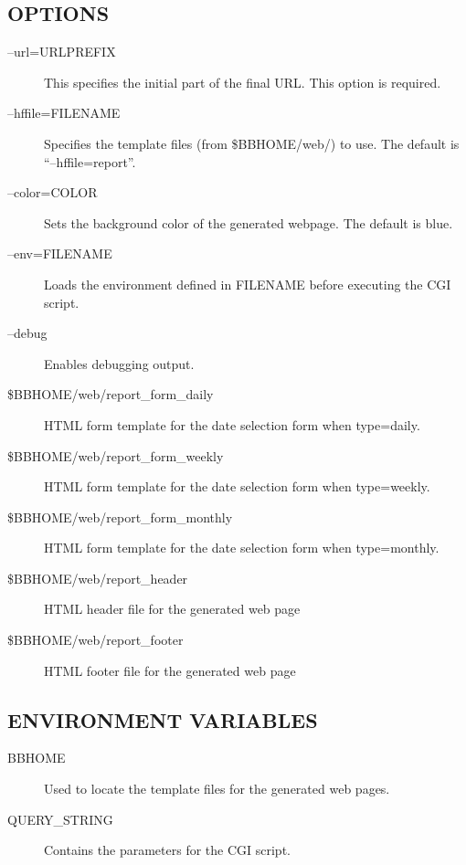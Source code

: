 \subsection{OPTIONS}
\begin{description}
\item[--url=URLPREFIX] This specifies the initial part of the final URL. This option is required. 

 

\item[--hffile=FILENAME] Specifies the template files (from \$BBHOME/web/) to use. The default is ``--hffile=report''. 

 

\item[--color=COLOR] Sets the background color of the generated webpage. The default is blue. 

 

\item[--env=FILENAME] Loads the environment defined in FILENAME before executing the CGI script. 

 

\item[--debug] Enables debugging output. 

 

\item[\$BBHOME/web/report\_form\_daily] HTML form template for the date selection form when type=daily. 

 

\item[\$BBHOME/web/report\_form\_weekly] HTML form template for the date selection form when type=weekly. 

 

\item[\$BBHOME/web/report\_form\_monthly] HTML form template for the date selection form when type=monthly. 

 

\item[\$BBHOME/web/report\_header] HTML header file for the generated web page 

 

\item[\$BBHOME/web/report\_footer] HTML footer file for the generated web page 

 


\end{description}
\subsection{ENVIRONMENT VARIABLES}
\begin{description}
\item[BBHOME] Used to locate the template files for the generated web pages. 

 

\item[QUERY\_STRING] Contains the parameters for the CGI script. 

 


\end{description}
